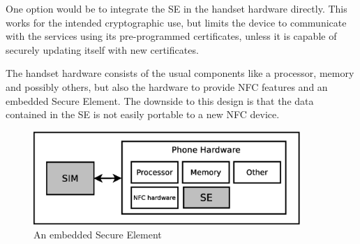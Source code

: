 \begin{enumerate}

\begin{item}
One option would be to integrate the SE in the handset hardware directly.
This works for the intended cryptographic use, but limits the device to communicate with the services using its pre-programmed certificates, unless it is capable of securely updating itself with new certificates.


The handset hardware consists of the usual components like a processor, memory and possibly others, but also the hardware to provide NFC features and an embedded Secure Element.
The downside to this design is that the data contained in the SE is not easily portable to a new NFC device.

\begin{figure}
\includegraphics[width=0.9\textwidth]{images/phone_with_SE_nokia}
\caption[Handset with embedded Secure Element]
{
An embedded Secure Element
}
\label{fig:integrated_se}
\end{figure}
\end{item}



\end{enumerate}
